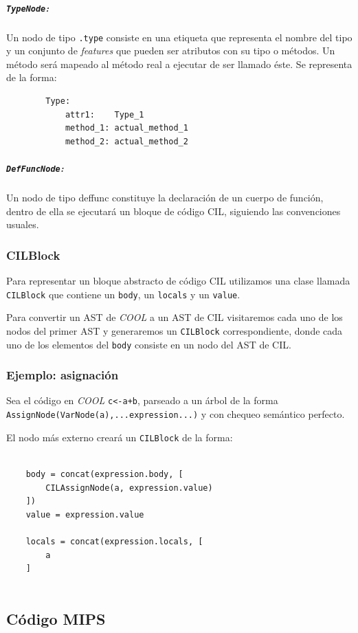 \documentclass[a4paper,10pt,twocolumn]{article}
\begin{document}
\subparagraph{\lstinline|TypeNode|:}

Un nodo de tipo \lstinline|.type| consiste en una etiqueta que representa el nombre del tipo y un conjunto de \textit{features} que pueden ser atributos con su tipo o métodos. Un método será mapeado al método real a ejecutar de ser llamado éste. Se representa de la forma:

\begin{center}
	\begin{lstlisting}
		Type:
			attr1: 	  Type_1
			method_1: actual_method_1
			method_2: actual_method_2
	\end{lstlisting}
\end{center}

\subparagraph{\lstinline|DefFuncNode|:}
Un nodo de tipo {deffunc} constituye la declaración de un cuerpo de función, dentro de ella se ejecutará un bloque de código CIL, siguiendo las convenciones usuales. 

\subsubsection{CILBlock}
Para representar un bloque abstracto de código CIL utilizamos una clase llamada \lstinline|CILBlock| que contiene un \lstinline|body|, un \lstinline|locals| y un \lstinline|value|. 

Para convertir un AST de \textit{COOL} a un AST de CIL visitaremos cada uno de los nodos del primer AST y generaremos un \lstinline|CILBlock| correspondiente, donde cada uno de los elementos del \lstinline|body| consiste en un nodo del AST de CIL.

\subsubsection{Ejemplo: asignación}
Sea el código en \textit{COOL} \lstinline|c<-a+b|, parseado a un árbol de la forma \lstinline|AssignNode(VarNode(a),...expression...)| y con chequeo semántico perfecto. 

El nodo más externo creará un \lstinline|CILBlock| de la forma:
	\begin{lstlisting}
	
	body = concat(expression.body, [ 
		CILAssignNode(a, expression.value)
	])
	value = expression.value
	
	locals = concat(expression.locals, [
		a
	]
	
	\end{lstlisting}

\subsection{Código MIPS}
\end{document}
